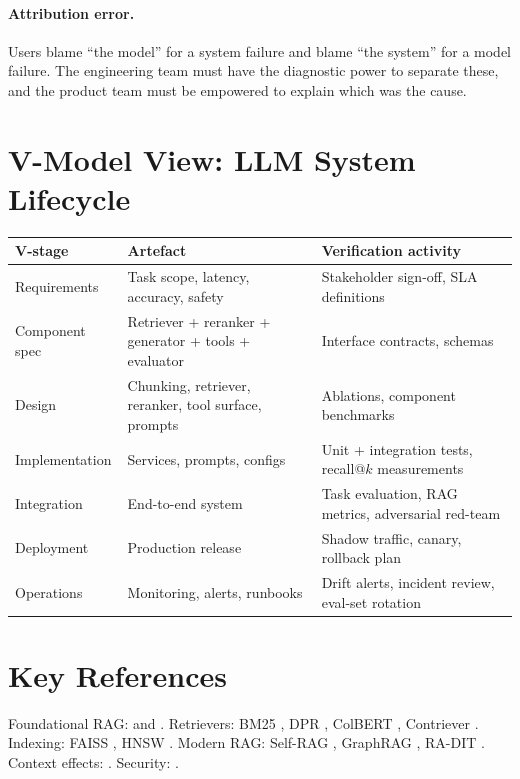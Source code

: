 \paragraph{Attribution error.} Users blame ``the model'' for a
system failure and blame ``the system'' for a model failure. The
engineering team must have the diagnostic power to separate these,
and the product team must be empowered to explain which was the
cause.

\section{V-Model View: LLM System Lifecycle}

\begin{center}
\small
\begin{tabular}{p{4.3cm}|p{4.3cm}|p{4.3cm}}
\textbf{V-stage} & \textbf{Artefact} & \textbf{Verification activity}\\\hline
Requirements & Task scope, latency, accuracy, safety & Stakeholder sign-off, SLA definitions \\
Component spec & Retriever + reranker + generator + tools + evaluator & Interface contracts, schemas \\
Design & Chunking, retriever, reranker, tool surface, prompts & Ablations, component benchmarks \\
Implementation & Services, prompts, configs & Unit + integration tests, recall@$k$ measurements \\
Integration & End-to-end system & Task evaluation, RAG metrics, adversarial red-team \\
Deployment & Production release & Shadow traffic, canary, rollback plan \\
Operations & Monitoring, alerts, runbooks & Drift alerts, incident review, eval-set rotation \\
\end{tabular}
\end{center}

\section{Key References}

Foundational RAG: \citet{lewis2020retrieval} and \citet{guu2020realm}.
Retrievers: BM25 \citep{robertson2009bm25}, DPR
\citep{karpukhin2020dpr}, ColBERT \citep{khattab2020colbert},
Contriever \citep{izacard2022contriever}. Indexing: FAISS
\citep{johnson2019faiss}, HNSW \citep{malkov2020hnsw}.
Modern RAG: Self-RAG \citep{asai2024selfrag}, GraphRAG
\citep{edge2024graphrag}, RA-DIT \citep{lin2024radit}. Context
effects: \citet{liu2024lost}. Security:
\citet{greshake2023injection}.

